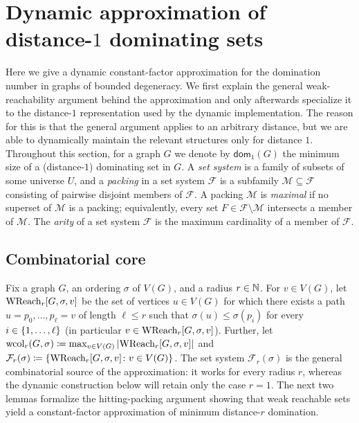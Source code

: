 \section{Dynamic approximation of distance-\texorpdfstring{$1$}{1} dominating sets}\label{sec:apx}

Here we give a dynamic constant-factor approximation for the domination number in graphs of bounded degeneracy.
We first explain the general weak-reachability argument behind the approximation and only afterwards specialize it to the distance-$1$ representation used by the dynamic implementation. The reason for this is that the general argument applies to an arbitrary distance, but we are able to dynamically maintain the relevant structures only for distance $1$.
Throughout this section, for a graph $G$ we denote by $\mathsf{dom}_1(G)$ the minimum size of a (distance-$1$) dominating set in $G$. A \emph{set system} is a family of subsets of some universe $U$, and a \emph{packing} in a set system $\mathcal{F}$ is a subfamily $\mathcal{M}\subseteq \mathcal{F}$ consisting of pairwise disjoint members of $\mathcal{F}$. A packing $\mathcal{M}$ is \emph{maximal} if no superset of $\mathcal{M}$ is a packing; equivalently, every set $F\in \mathcal{F}\setminus \mathcal{M}$ intersects a member of $\mathcal{M}$. The \emph{arity} of a set system $\mathcal{F}$ is the maximum cardinality of a member of $\mathcal{F}$.

\subsection{Combinatorial core}

Fix a graph $G$, an ordering $\sigma$ of $V(G)$, and a radius $r\in\mathbb{N}$.
For $v\in V(G)$, let $\textrm{WReach}_r[G,\sigma,v]$ be the set of vertices $u\in V(G)$ for which there exists a path $u=p_0,\ldots,p_\ell=v$ of length $\ell\le r$ such that $\sigma(u)\le \sigma(p_i)$ for every $i\in\{1,\ldots,\ell\}$ (in particular $v \in \textrm{WReach}_r[G, \sigma, v]$).
Further, let $\textrm{wcol}_r(G,\sigma)\coloneqq\max_{v\in V(G)} |\textrm{WReach}_r[G,\sigma,v]|$ and $\mathcal{F}_r(\sigma)\coloneqq\{\textrm{WReach}_r[G,\sigma,v] \colon v\in V(G)\}$.
The set system $\mathcal{F}_r(\sigma)$ is the general combinatorial source of the approximation: it works for every radius $r$, whereas the dynamic construction below will retain only the case $r=1$.
The next two lemmas formalize the hitting-packing argument showing that weak reachable sets yield a constant-factor approximation of minimum distance-$r$ domination.

